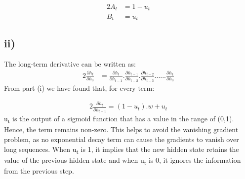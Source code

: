 \begin{alignat}{2}
    A_t &= 1-u_t
\\ B_t &= u_t
\end{alignat}

\subsection*{ii)}
The long-term derivative can be written as:
\begin{alignat}{2}
\frac {\partial h_t}{\partial h_0} &= \frac {\partial h_t}{\partial h_{t-1}} . \frac {\partial h_{t-1}}{\partial h_{t-2}}. \frac {\partial h_{t-2}}{\partial h_{t-3}}...... \frac {\partial h_1}{\partial h_0} 
\end{alignat}
From part (i) we have found that, for every term:

\begin{alignat}{2}
\frac {\partial h_t}{\partial h_{t-1}} = (1-u_t) .w + u_t
\end{alignat}
u\textsubscript{t} is the output of a sigmoid function that has a value in the range of (0,1). Hence, the term remains non-zero. This helps to avoid the vanishing gradient problem, as no exponential decay term can cause the gradients to vanish over long sequences.
When u\textsubscript{t} is 1, it implies that the new hidden state retains the value of the previous hidden state and when u\textsubscript{t} is 0, it ignores the information from the previous step. 



